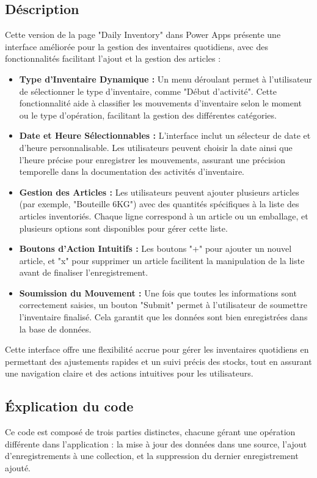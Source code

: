 \documentclass[a4paper, oneside, 12pt, final]{extreport}
\begin{document}
\subsection{Déscription}
Cette version de la page "Daily Inventory" dans Power Apps présente une interface améliorée pour la gestion des inventaires quotidiens, avec des fonctionnalités facilitant l'ajout et la gestion des articles :
\begin{itemize}


\item \textbf{Type d'Inventaire Dynamique :} Un menu déroulant permet à l'utilisateur de sélectionner le type d'inventaire, comme "Début d'activité". Cette fonctionnalité aide à classifier les mouvements d'inventaire selon le moment ou le type d'opération, facilitant la gestion des différentes catégories.

\item \textbf{Date et Heure Sélectionnables :} L'interface inclut un sélecteur de date et d'heure personnalisable. Les utilisateurs peuvent choisir la date ainsi que l'heure précise pour enregistrer les mouvements, assurant une précision temporelle dans la documentation des activités d'inventaire.

\item \textbf{Gestion des Articles :} Les utilisateurs peuvent ajouter plusieurs articles (par exemple, "Bouteille 6KG") avec des quantités spécifiques à la liste des articles inventoriés. Chaque ligne correspond à un article ou un emballage, et plusieurs options sont disponibles pour gérer cette liste.

\item \textbf{Boutons d'Action Intuitifs :} Les boutons "+"  pour ajouter un nouvel article, et "x" pour supprimer un article facilitent la manipulation de la liste avant de finaliser l'enregistrement.

\item \textbf{Soumission du Mouvement :} Une fois que toutes les informations sont correctement saisies, un bouton "Submit" permet à l'utilisateur de soumettre l'inventaire finalisé. Cela garantit que les données sont bien enregistrées dans la base de données.
\end{itemize}
Cette interface offre une flexibilité accrue pour gérer les inventaires quotidiens en permettant des ajustements rapides et un suivi précis des stocks, tout en assurant une navigation claire et des actions intuitives pour les utilisateurs.
\subsection{Éxplication du code}
Ce code est composé de trois parties distinctes, chacune gérant une opération différente dans l'application : la mise à jour des données dans une source, l'ajout d'enregistrements à une collection, et la suppression du dernier enregistrement ajouté.
\end{document}
